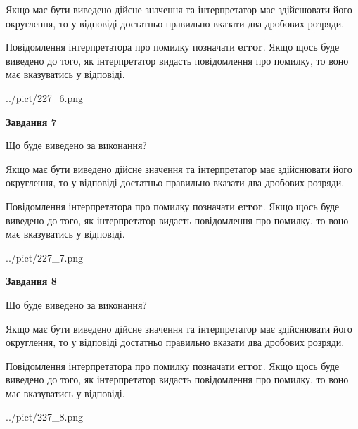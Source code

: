 \documentclass[12pt, ukrainian]{article}
\begin{document}
{\begin {Large}
Якщо має бути виведено дійсне значення та інтерпретатор має здійснювати його округлення, 
то у відповіді достатньо правильно вказати два дробових розряди.

Повідомлення інтерпретатора про помилку позначати \textbf{error}.
Якщо щось буде виведено до того, як інтерпретатор видасть повідомлення про помилку, 
то воно має вказуватись у відповіді. \par

\begin{center}
	{../pict/227_6.png}
\end{center}
\newpage

{\begin {center}\textbf{Завдання 7}\end {center}}\par
Що буде виведено за виконання? \par

Якщо має бути виведено дійсне значення та інтерпретатор має здійснювати його округлення, 
то у відповіді достатньо правильно вказати два дробових розряди.

Повідомлення інтерпретатора про помилку позначати \textbf{error}.
Якщо щось буде виведено до того, як інтерпретатор видасть повідомлення про помилку, 
то воно має вказуватись у відповіді. \par

\begin{center}
	{../pict/227_7.png}
\end{center}
\newpage

{\begin {center}\textbf{Завдання 8}\end {center}}\par
Що буде виведено за виконання? \par

Якщо має бути виведено дійсне значення та інтерпретатор має здійснювати його округлення, 
то у відповіді достатньо правильно вказати два дробових розряди.

Повідомлення інтерпретатора про помилку позначати \textbf{error}.
Якщо щось буде виведено до того, як інтерпретатор видасть повідомлення про помилку, 
то воно має вказуватись у відповіді. \par

\begin{center}
	{../pict/227_8.png}
\end{center}
\newpage


\end{Large}}
\end{document}

